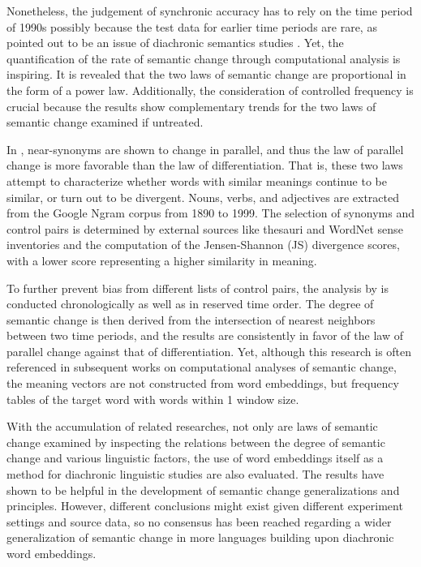 Nonetheless, the judgement of synchronic accuracy has to rely on the time period of 1990s possibly because the test data for earlier time periods are rare, as pointed out to be an issue of diachronic semantics studies \parencite{wevers2020digital}. Yet, the quantification of the rate of semantic change through computational analysis is inspiring. It is revealed that the two laws of semantic change are proportional in the form of a power law. Additionally, the consideration of controlled frequency is crucial because the results show complementary trends for the two laws of semantic change examined if untreated.

In \textcite{xu2015computational}, near-synonyms are shown to change in parallel, and thus the law of parallel change is more favorable than the law of differentiation. That is, these two laws attempt to characterize whether words with similar meanings continue to be similar, or turn out to be divergent. Nouns, verbs, and adjectives are extracted from the Google Ngram corpus from 1890 to 1999. The selection of synonyms and control pairs is determined by external sources like thesauri and WordNet sense inventories and the computation of the Jensen-Shannon (JS) divergence scores, with a lower score representing a higher similarity in meaning.

To further prevent bias from different lists of control pairs, the analysis by \textcite{xu2015computational} is conducted chronologically as well as in reserved time order. The degree of semantic change is then derived from the intersection of nearest neighbors between two time periods, and the results are consistently in favor of the law of parallel change against that of differentiation. Yet, although this research is often referenced in subsequent works on computational analyses of semantic change, the meaning vectors are not constructed from word embeddings, but frequency tables of the target word with words within 1 window size.

With the accumulation of related researches, not only are laws of semantic change examined by inspecting the relations between the degree of semantic change and various linguistic factors, the use of word embeddings itself as a method for diachronic linguistic studies are also evaluated. The results have shown to be helpful in the development of semantic change generalizations and principles. However, different conclusions might exist given different experiment settings and source data, so no consensus has been reached regarding a wider generalization of semantic change in more languages building upon diachronic word embeddings.



